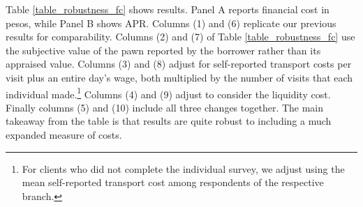 \documentclass[oneside,11pt]{article}
\begin{document}
Table \ref{table_robustness_fc} shows results. Panel A reports financial cost in pesos, while Panel B shows APR. Columns (1) and (6) replicate our previous results for comparability. Columns (2) and (7) of Table \ref{table_robustness_fc} use the subjective value of the pawn reported by the borrower rather than its appraised value. Columns (3) and (8) adjust for self-reported transport costs per visit plus an entire day's wage, both multiplied by the number of visits that each individual made.\footnote{For clients who did not complete the individual survey, we adjust using the mean self-reported transport cost among respondents of the respective branch.} Columns (4) and (9) adjust to consider the liquidity cost. Finally columns (5) and (10) include all three changes together. The main takeaway from the table is that results are quite robust to including a much expanded measure of costs. 



\end{document}
